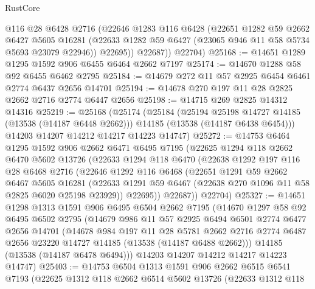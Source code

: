 \begin{lexlean}{RustCore}
\begin{coremodule}
          @116
          @28
          @6428
          @2716
          (@22646
            @1283
            @116
            @6428
            (@22651
              @1282
              @59
              @2662
              @6427
              @5605
              @16281
              (@22633 @1282 @59 @6427 (@23065 @946 @11 @58 @5734 @5693 @23079 @22946))
              @22695))
          @22687))
      @22704)
@25168 := @14651 @1289 @1295 @1592 @906 @6455 @6464 @2662 @7197
@25174 := @14670 @1288 @58 @92 @6455 @6462 @2795
@25184 := @14679 @272 @11 @57 @2925 @6454 @6461 @2774 @6437 @2656 @14701
@25194 := @14678 @270 @197 @11 @28 @2825 @2662 @2716 @2774 @6447 @2656
@25198 := @14715 @269 @2825 @14312 @14316
@25219 := @25168
    (@25174
      (@25184
        (@25194 @25198 @14727 @14185 (@13538 (@14187 @6448 @2662)))
        @14185
        (@13538 (@14187 @6438 @6454)))
      @14203
      @14207
      @14212
      @14217
      @14223
      @14747)
@25272 := @14753
    @6464
    @1295
    @1592
    @906
    @2662
    @6471
    @6495
    @7195
    (@22625
      @1294
      @118
      @2662
      @6470
      @5602
      @13726
      (@22633
        @1294
        @118
        @6470
        (@22638
          @1292
          @197
          @116
          @28
          @6468
          @2716
          (@22646
            @1292
            @116
            @6468
            (@22651
              @1291
              @59
              @2662
              @6467
              @5605
              @16281
              (@22633 @1291 @59 @6467 (@22638 @270 @1096 @11 @58 @2825 @6020 @25198 @23929))
              @22695))
          @22687))
      @22704)
@25327 := @14651
    @1298
    @1313
    @1591
    @906
    @6495
    @6504
    @2662
    @7195
    (@14670
      @1297
      @58
      @92
      @6495
      @6502
      @2795
      (@14679
        @986
        @11
        @57
        @2925
        @6494
        @6501
        @2774
        @6477
        @2656
        @14701
        (@14678
          @984
          @197
          @11
          @28
          @5781
          @2662
          @2716
          @2774
          @6487
          @2656
          @23220
          @14727
          @14185
          (@13538 (@14187 @6488 @2662)))
        @14185
        (@13538 (@14187 @6478 @6494)))
      @14203
      @14207
      @14212
      @14217
      @14223
      @14747)
@25403 := @14753
    @6504
    @1313
    @1591
    @906
    @2662
    @6515
    @6541
    @7193
    (@22625
      @1312
      @118
      @2662
      @6514
      @5602
      @13726
      (@22633
        @1312
        @118

\end{coremodule}
\end{lexlean}
